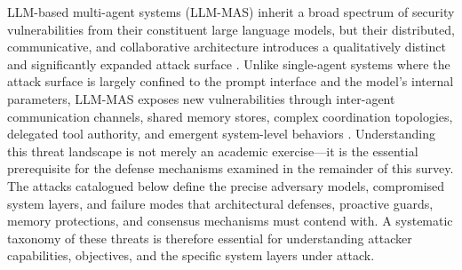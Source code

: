 \documentclass[11pt]{article}
\begin{document}
LLM-based multi-agent systems (LLM-MAS) inherit a broad spectrum of security vulnerabilities from their constituent large language models, but their distributed, communicative, and collaborative architecture introduces a qualitatively distinct and significantly expanded attack surface \cite{ref405}. Unlike single-agent systems where the attack surface is largely confined to the prompt interface and the model's internal parameters, LLM-MAS exposes new vulnerabilities through inter-agent communication channels, shared memory stores, complex coordination topologies, delegated tool authority, and emergent system-level behaviors \cite{ref406,ref407}. Understanding this threat landscape is not merely an academic exercise---it is the essential prerequisite for the defense mechanisms examined in the remainder of this survey. The attacks catalogued below define the precise adversary models, compromised system layers, and failure modes that architectural defenses, proactive guards, memory protections, and consensus mechanisms must contend with. A systematic taxonomy of these threats is therefore essential for understanding attacker capabilities, objectives, and the specific system layers under attack.
\end{document}
